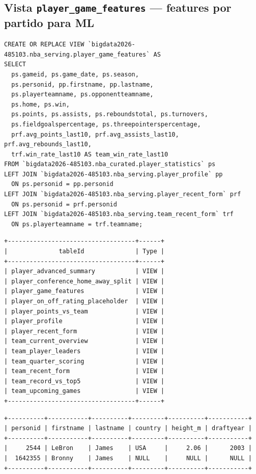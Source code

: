 \documentclass[12pt, letterpaper]{article}
\begin{document}
\subsection{Vista \texttt{player\_game\_features} — features por partido para ML}

\begin{lstlisting}[style=codestyle, caption={Vista \texttt{player\_game\_features} --- stats partido x jugador con contexto de equipo y rolling features}]
CREATE OR REPLACE VIEW `bigdata2026-485103.nba_serving.player_game_features` AS
SELECT
  ps.gameid, ps.game_date, ps.season,
  ps.personid, pp.firstname, pp.lastname,
  ps.playerteamname, ps.opponentteamname,
  ps.home, ps.win,
  ps.points, ps.assists, ps.reboundstotal, ps.turnovers,
  ps.fieldgoalspercentage, ps.threepointerspercentage,
  prf.avg_points_last10, prf.avg_assists_last10, prf.avg_rebounds_last10,
  trf.win_rate_last10 AS team_win_rate_last10
FROM `bigdata2026-485103.nba_curated.player_statistics` ps
LEFT JOIN `bigdata2026-485103.nba_serving.player_profile` pp
  ON ps.personid = pp.personid
LEFT JOIN `bigdata2026-485103.nba_serving.player_recent_form` prf
  ON ps.personid = prf.personid
LEFT JOIN `bigdata2026-485103.nba_serving.team_recent_form` trf
  ON ps.playerteamname = trf.teamname;
\end{lstlisting}

\begin{lstlisting}[style=outputstyle, caption={Evidencia --- \texttt{bq ls nba\_serving} muestra 13 vistas desplegadas}]
+-----------------------------------+------+
|              tableId              | Type |
+-----------------------------------+------+
| player_advanced_summary           | VIEW |
| player_conference_home_away_split | VIEW |
| player_game_features              | VIEW |
| player_on_off_rating_placeholder  | VIEW |
| player_points_vs_team             | VIEW |
| player_profile                    | VIEW |
| player_recent_form                | VIEW |
| team_current_overview             | VIEW |
| team_player_leaders               | VIEW |
| team_quarter_scoring              | VIEW |
| team_recent_form                  | VIEW |
| team_record_vs_top5               | VIEW |
| team_upcoming_games               | VIEW |
+-----------------------------------+------+
\end{lstlisting}

\begin{lstlisting}[style=outputstyle, caption={Evidencia --- smoke test en \texttt{player\_profile}: LeBron James con datos verificados}]
+----------+-----------+----------+---------+----------+-----------+
| personid | firstname | lastname | country | height_m | draftyear |
+----------+-----------+----------+---------+----------+-----------+
|     2544 | LeBron    | James    | USA     |     2.06 |      2003 |
|  1642355 | Bronny    | James    | NULL    |     NULL |      NULL |
+----------+-----------+----------+---------+----------+-----------+
\end{lstlisting}
\end{document}
